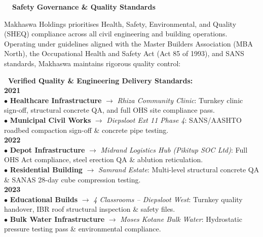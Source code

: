 \documentclass[a4paper,11pt]{article}
\begin{document}
\noindent
{\fontsize{18pt}{22pt}\selectfont\bfseries\color{mhblue}\faAward\ \ Safety Governance \& Quality Standards}
\vspace{0.2cm}

\noindent
{\fontsize{8.5pt}{12.2pt}\selectfont\color{mhtext}
Makhaswa Holdings prioritises Health, Safety, Environmental, and Quality (SHEQ) compliance across all civil engineering and building operations. Operating under guidelines aligned with the Master Builders Association (MBA North), the Occupational Health and Safety Act (Act 85 of 1993), and SANS standards, Makhaswa maintains rigorous quality control:
}

\vspace{0.35cm}

\noindent
\begin{minipage}[t]{0.58\textwidth}
    {\fontsize{10pt}{12pt}\selectfont\bfseries\color{mhnavy}\faCertificate\ Verified Quality \& Engineering Delivery Standards:}\\[0.18cm]

    {\fontsize{7.8pt}{10.8pt}\selectfont\color{mhtext}
    \textbf{\color{mhblue}2021}\\
    $\bullet$ \textbf{Healthcare Infrastructure} $\rightarrow$ \textit{Rhiza Community Clinic}: Turnkey clinic sign-off, structural concrete QA, and full OHS site compliance pass.\\
    $\bullet$ \textbf{Municipal Civil Works} $\rightarrow$ \textit{Diepsloot Ext 11 Phase 4}: SANS/AASHTO roadbed compaction sign-off \& concrete pipe testing.\\[3pt]

    \textbf{\color{mhblue}2022}\\
    $\bullet$ \textbf{Depot Infrastructure} $\rightarrow$ \textit{Midrand Logistics Hub (Pikitup SOC Ltd)}: Full OHS Act compliance, steel erection QA \& ablution reticulation.\\
    $\bullet$ \textbf{Residential Building} $\rightarrow$ \textit{Samrand Estate}: Multi-level structural concrete QA \& SANAS 28-day cube compression testing.\\[3pt]

    \textbf{\color{mhblue}2023}\\
    $\bullet$ \textbf{Educational Builds} $\rightarrow$ \textit{4 Classrooms -- Diepsloot West}: Turnkey quality handover, IBR roof structural inspection \& safety files.\\
    $\bullet$ \textbf{Bulk Water Infrastructure} $\rightarrow$ \textit{Moses Kotane Bulk Water}: Hydrostatic pressure testing pass \& environmental compliance.\\[3pt]

}
\end{minipage}
\end{document}
